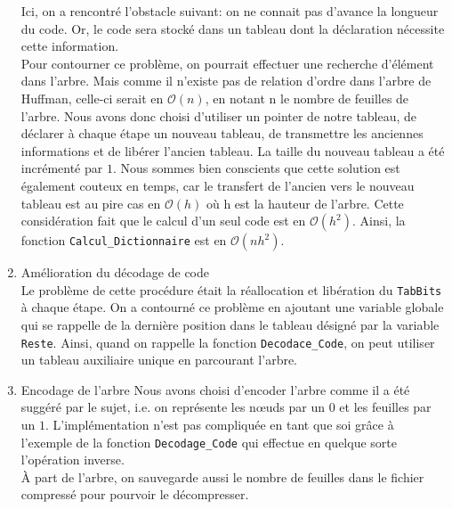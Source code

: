 \documentclass[a4paper,11pt]{article}
\begin{document}
\begin{enumerate}
			Ici, on a rencontré l'obstacle suivant: on ne connait pas d'avance la longueur du code. Or, le code sera stocké dans un tableau dont la déclaration nécessite cette information.\\
			Pour contourner ce problème, on pourrait effectuer une recherche d'élément dans l'arbre. Mais comme il n'existe pas de relation d'ordre dans l'arbre de Huffman, celle-ci serait en $\mathcal{O}(n)$, en notant n le nombre de feuilles de l'arbre.
			Nous avons donc choisi d'utiliser un pointer de notre tableau, de déclarer à chaque étape un nouveau tableau, de transmettre les anciennes informations et de libérer l'ancien tableau. La taille du nouveau tableau a été incrémenté par $1$. 
			Nous sommes bien conscients que cette solution est également couteux en temps, car le transfert de l'ancien vers le nouveau tableau est au pire cas en $\mathcal{O}(h)$ où h est la hauteur de l'arbre. Cette considération fait que le calcul d'un seul code est en $\mathcal{O}(h^2)$. 
			Ainsi, la fonction \verb+Calcul_Dictionnaire+ est en $\mathcal{O}(nh^2)$.
		\item{Amélioration du décodage de code}\\
			Le problème de cette procédure était la réallocation et libération du \verb+TabBits+ à chaque étape. On a contourné ce problème en ajoutant une variable globale qui se rappelle de la dernière position dans le tableau désigné par la variable \verb+Reste+. Ainsi, quand on rappelle la fonction \verb+Decodace_Code+, on peut utiliser un tableau auxiliaire unique en parcourant l'arbre.
		\item{Encodage de l'arbre}
			Nous avons choisi d'encoder l'arbre comme il a été suggéré par le sujet, i.e. on représente les n\oe{}uds par un $0$ et les feuilles par un $1$. L'implémentation n'est pas compliquée en tant que soi grâce à l'exemple de la fonction \verb+Decodage_Code+ qui effectue en quelque sorte l'opération inverse.\\
			À part de l'arbre, on sauvegarde aussi le nombre de feuilles dans le fichier compressé pour pourvoir le décompresser.
	\end{enumerate}
\end{document}
